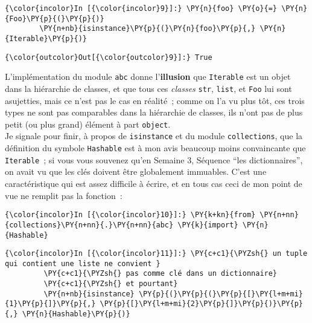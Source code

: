     \begin{Verbatim}[commandchars=\\\{\}]
{\color{incolor}In [{\color{incolor}9}]:} \PY{n}{foo} \PY{o}{=} \PY{n}{Foo}\PY{p}{(}\PY{p}{)}
        \PY{n+nb}{isinstance}\PY{p}{(}\PY{n}{foo}\PY{p}{,} \PY{n}{Iterable}\PY{p}{)}
\end{Verbatim}


\begin{Verbatim}[commandchars=\\\{\}]
{\color{outcolor}Out[{\color{outcolor}9}]:} True
\end{Verbatim}
            
    L'implémentation du module \texttt{abc} donne l'\textbf{illusion} que
\texttt{Iterable} est un objet dans la hiérarchie de classes, et que
tous ces \emph{classes} \texttt{str}, \texttt{list}, et \texttt{Foo} lui
sont asujetties, mais ce n'est pas le cas en réalité~; comme on l'a vu
plus tôt, ces trois types ne sont pas comparables dans la hiérarchie de
classes, ils n'ont pas de plus petit (ou plus grand) élément à part
\texttt{object}.\\

    Je signale pour finir, à propos de \texttt{isinstance} et du module
\texttt{collections}, que la définition du symbole \texttt{Hashable} est
à mon avis beaucoup moins convaincante que \texttt{Iterable}~; si vous
vous souvenez qu'en Semaine 3, Séquence ``les dictionnaires'', on avait
vu que les clés doivent être globalement immuables. C'est une
caractéristique qui est assez difficile à écrire, et en tous cas ceci de
mon point de vue ne remplit pas la fonction~:

    \begin{Verbatim}[commandchars=\\\{\}]
{\color{incolor}In [{\color{incolor}10}]:} \PY{k+kn}{from} \PY{n+nn}{collections}\PY{n+nn}{.}\PY{n+nn}{abc} \PY{k}{import} \PY{n}{Hashable}
\end{Verbatim}


    \begin{Verbatim}[commandchars=\\\{\}]
{\color{incolor}In [{\color{incolor}11}]:} \PY{c+c1}{\PYZsh{} un tuple qui contient une liste ne convient }
         \PY{c+c1}{\PYZsh{} pas comme clé dans un dictionnaire}
         \PY{c+c1}{\PYZsh{} et pourtant}
         \PY{n+nb}{isinstance} \PY{p}{(}\PY{p}{(}\PY{p}{[}\PY{l+m+mi}{1}\PY{p}{]}\PY{p}{,} \PY{p}{[}\PY{l+m+mi}{2}\PY{p}{]}\PY{p}{)}\PY{p}{,} \PY{n}{Hashable}\PY{p}{)}
\end{Verbatim}


